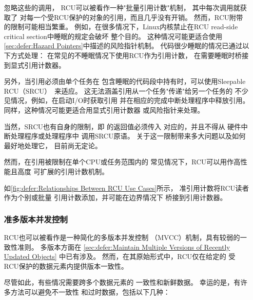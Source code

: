 忽略这些的调用，
RCU可以被看作一种"批量引用计数"机制，
其中每次调用就获取了
对每一个受RCU保护的对象的引用，而且几乎没有开销。
然而，RCU附带的限制可能相当繁重。
例如，在很多情况下，Linux内核禁止在RCU
read-side critical section中睡眠的规定会破坏
整个目的。
这种情况可能更适合使用
\cref{sec:defer:Hazard Pointers}中描述的风险指针机制。
代码很少睡眠的情况已通过以下方式处理：
在常见的不睡眠情况下使用RCU作为引用计数，
在需要睡眠时桥接到显式引用计数器。

另外，当引用必须由单个任务在
包含睡眠的代码段中持有时，可以使用Sleepable
RCU（SRCU）~\cite{PaulEMcKenney2006c}来适应。
这无法涵盖引用从一个任务"传递"给另一个任务的
不少见情况，例如，在启动I/O时获取引用
并在相应的完成中断处理程序中释放引用。
同样，这种情况可能更适合用显式引用计数器
或风险指针来处理。

当然，SRCU也有自身的限制，即
的返回值必须传入
对应的，并且不得从
硬件中断处理程序或处理程序中
调用SRCU原语。
关于这一限制带来多大问题以及如何最好地处理它，
目前尚无定论。

然而，在引用被限制在单个CPU或任务范围内的
常见情况下，RCU可以用作高性能且高度
可扩展的引用计数机制。

如\cref{fig:defer:Relationships Between RCU Use Cases}所示，
准引用计数将RCU读者作为个别或批量
引用计数添加，并可能在边界情况下
桥接到引用计数器。

\subsubsection{准多版本并发控制}
\label{sec:defer:Quasi Multi-Version Concurrency Control}

RCU也可以被看作是一种简化的多版本并发控制
（MVCC）机制，具有较弱的一致性准则。
多版本方面在
\cref{sec:defer:Maintain Multiple Versions of Recently Updated Objects}
中已有涉及。
然而，在其原始形式中，RCU仅在给定的
受RCU保护的数据元素内提供版本一致性。

尽管如此，有些情况需要跨多个数据元素的
一致性和新鲜数据。
幸运的是，有许多方法可以避免不一致性
和过时数据，包括以下几种：


